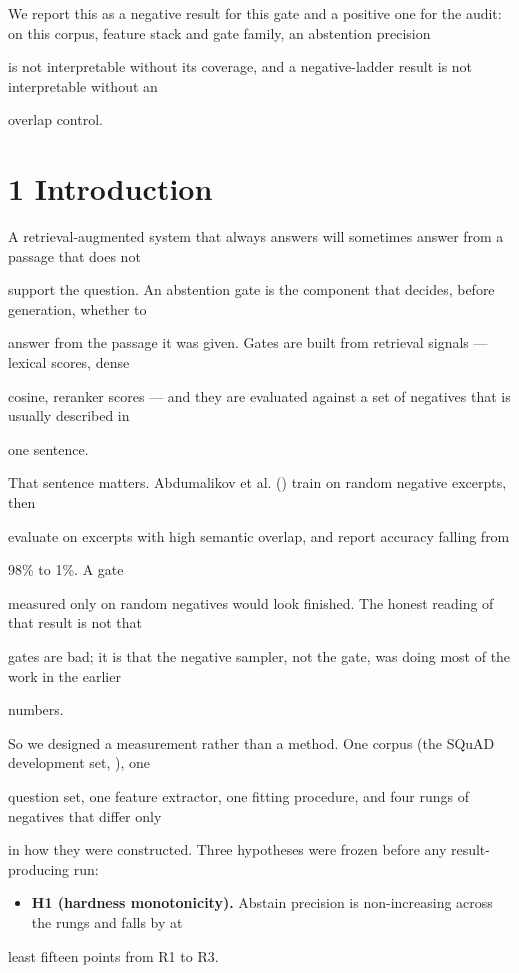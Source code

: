 We report this as a negative result for this gate and a positive one for the audit: on this corpus, feature stack and gate family, an abstention precision

is not interpretable without its coverage, and a negative-ladder result is not interpretable without an

overlap control.

\section{1 Introduction}
A retrieval-augmented system that always answers will sometimes answer from a passage that does not

support the question. An abstention gate is the component that decides, before generation, whether to

answer from the passage it was given. Gates are built from retrieval signals --- lexical scores, dense

cosine, reranker scores --- and they are evaluated against a set of negatives that is usually described in

one sentence.

That sentence matters. Abdumalikov et al. (\citep{answerability-in-retrieval-augmented-open-domain-question-an}) train on random negative excerpts, then

evaluate on excerpts with high semantic overlap, and report accuracy falling from

98\% to 1\%. A gate

measured only on random negatives would look finished. The honest reading of that result is not that

gates are bad; it is that the negative sampler, not the gate, was doing most of the work in the earlier

numbers.

So we designed a measurement rather than a method. One corpus (the SQuAD development set, \citep{know-what-you-don-t-know-unanswerable-questions-for-squad}), one

question set, one feature extractor, one fitting procedure, and four rungs of negatives that differ only

in how they were constructed. Three hypotheses were frozen before any result-producing run:

\begin{itemize}
  \item \textbf{H1 (hardness monotonicity).} Abstain precision is non-increasing across the rungs and falls by at
\end{itemize}
least fifteen points from R1 to R3.

